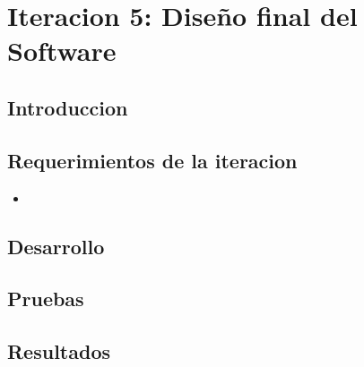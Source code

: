 \chapter{Iteracion 5: Diseño final del Software} %
\label{cha:iteracion_5}

\section{Introduccion} %
\label{sec:introduccion}


\section{Requerimientos de la iteracion} %
\label{sec:requerimientos_de_la_iteracion}

\begin{itemize}
\item
\end{itemize}



\section{Desarrollo} %
\label{sec:desarrollo}


\section{Pruebas} %
\label{sec:pruebas}


\section{Resultados} %
\label{sec:resultados}


